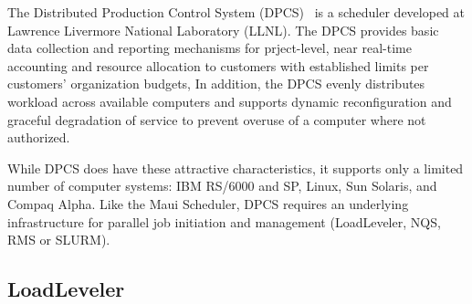 The Distributed Production Control System (DPCS)~\cite{DPCS}
is a scheduler developed at Lawrence Livermore National Laboratory (LLNL). 
The DPCS provides basic data collection and reporting
mechanisms for prject-level, near real-time accounting and resource allocation
to customers with established limits per customers' organization budgets,
In addition, the DPCS evenly distributes workload across available computers
and supports dynamic reconfiguration and graceful degradation of service to prevent
overuse of a computer where not authorized.

While DPCS does have these attractive characteristics, it supports only a 
limited number of computer systems: IBM RS/6000 and SP, Linux, 
Sun Solaris, and Compaq Alpha. 
Like the Maui Scheduler, DPCS requires an underlying infrastructure for 
parallel job initiation and management (LoadLeveler, NQS, RMS or SLURM).

\subsection*{LoadLeveler}

